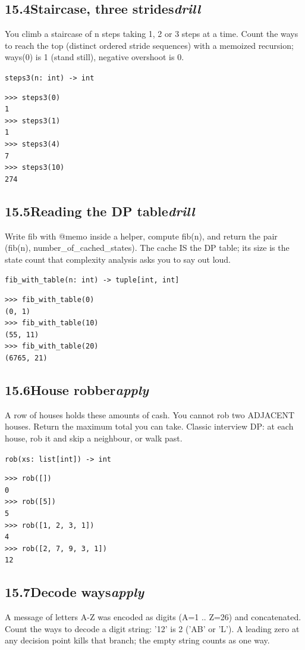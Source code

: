 \documentclass[10pt,letterpaper]{book}
\begin{document}
\subsection*{15.4\quad Staircase, three strides\hfill\textnormal{\textit{drill}}}
You climb a staircase of n steps taking 1, 2 or 3 steps at a time. Count the ways to reach the top (distinct ordered stride sequences) with a memoized recursion; ways(0) is 1 (stand still), negative overshoot is 0.

\noindent\texttt{steps3(n: int) -> int}
\begin{lstlisting}[style=ex]
>>> steps3(0)
1
>>> steps3(1)
1
>>> steps3(4)
7
>>> steps3(10)
274
\end{lstlisting}
\subsection*{15.5\quad Reading the DP table\hfill\textnormal{\textit{drill}}}
Write fib with @memo inside a helper, compute fib(n), and return the pair (fib(n), number\_of\_cached\_states). The cache IS the DP table; its size is the state count that complexity analysis asks you to say out loud.

\noindent\texttt{fib\_with\_table(n: int) -> tuple[int, int]}
\begin{lstlisting}[style=ex]
>>> fib_with_table(0)
(0, 1)
>>> fib_with_table(10)
(55, 11)
>>> fib_with_table(20)
(6765, 21)
\end{lstlisting}
\subsection*{15.6\quad House robber\hfill\textnormal{\textit{apply}}}
A row of houses holds these amounts of cash. You cannot rob two ADJACENT houses. Return the maximum total you can take. Classic interview DP: at each house, rob it and skip a neighbour, or walk past.

\noindent\texttt{rob(xs: list[int]) -> int}
\begin{lstlisting}[style=ex]
>>> rob([])
0
>>> rob([5])
5
>>> rob([1, 2, 3, 1])
4
>>> rob([2, 7, 9, 3, 1])
12
\end{lstlisting}
\subsection*{15.7\quad Decode ways\hfill\textnormal{\textit{apply}}}
A message of letters A-Z was encoded as digits (A=1 .. Z=26) and concatenated. Count the ways to decode a digit string: '12' is 2 ('AB' or 'L'). A leading zero at any decision point kills that branch; the empty string counts as one way.
\end{document}
